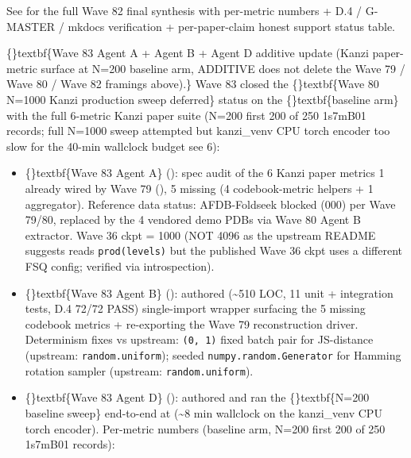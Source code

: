 \documentclass{article}
\begin{document}
See  for the full Wave 82 final synthesis with per-metric numbers + D.4 / G-MASTER / mkdocs verification + per-paper-claim honest support status table.

\{\}textbf\{Wave 83 Agent A + Agent B + Agent D additive update (Kanzi paper-metric surface at N=200 baseline arm, ADDITIVE  does not delete the Wave 79 / Wave 80 / Wave 82 framings above).\} Wave 83 closed the \{\}textbf\{Wave 80 N=1000 Kanzi production sweep deferred\} status on the \{\}textbf\{baseline arm\} with the full 6-metric Kanzi paper suite (N=200 first 200 of 250 1s7mB01 records; full N=1000 sweep attempted but kanzi\_venv CPU torch encoder too slow for the 40-min wallclock budget  see  6):

\begin{itemize}
\item \{\}textbf\{Wave 83 Agent A\} (): spec audit of the 6 Kanzi paper metrics  1 already wired by Wave 79 (), 5 missing (4 codebook-metric helpers + 1 aggregator). Reference data status: AFDB-Foldseek blocked (000) per Wave 79/80, replaced by the 4 vendored demo PDBs via Wave 80 Agent B extractor. Wave 36 ckpt  = 1000 (NOT 4096 as the upstream README suggests   reads \texttt{prod(levels)} but the published Wave 36 ckpt uses a different FSQ config; verified via  introspection).
\item \{\}textbf\{Wave 83 Agent B\} (): authored  (\textasciitilde{}510 LOC, 11 unit + integration tests, D.4 72/72 PASS)  single-import wrapper surfacing the 5 missing codebook metrics + re-exporting the Wave 79 reconstruction driver. Determinism fixes vs upstream: \texttt{(0, 1)} fixed batch pair for JS-distance (upstream: \texttt{random.uniform}); seeded \texttt{numpy.random.Generator} for Hamming rotation sampler (upstream: \texttt{random.uniform}).
\item \sloppy \{\}textbf\{Wave 83 Agent D\} (): authored  and ran the \{\}textbf\{N=200 baseline sweep\} end-to-end at  (\textasciitilde{}8 min wallclock on the kanzi\_venv CPU torch encoder). Per-metric numbers (baseline arm, N=200  first 200 of 250 1s7mB01 records):
\end{itemize}
\end{document}
